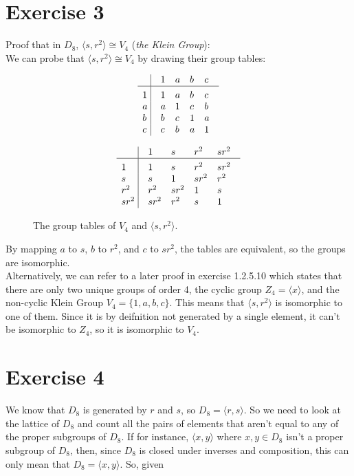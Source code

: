 \documentclass{article}
\begin{document}
    \section*{Exercise 3}
    Proof that in $D_8$, $\langle s, r^2 \rangle \cong V_4$
    (\textit{the Klein Group}): \\
    We can probe that $\langle s, r^2 \rangle \cong V_4$
    by drawing their group tables:

    \begin{figure}[H]
        \centering

        \[\vbox{\tabskip0.5em\offinterlineskip
        \halign{\strut$#$\hfil\ \tabskip1em\vrule&&$#$\hfil\cr
        ~   & 1   & a   & b & c \cr
        \noalign{\hrule}\vrule height 12pt width 0pt
        1   & 1 & a & b & c \cr 
        a   & a & 1 & c & b \cr 
        b   & b & c & 1 & a \cr 
        c   & c & b & a & 1 \cr
        }}\]

        
        \[\vbox{\tabskip0.5em\offinterlineskip
        \halign{\strut$#$\hfil\ \tabskip1em\vrule&&$#$\hfil\cr
        ~   & 1   & s   & r^2 & sr^2 \cr
        \noalign{\hrule}\vrule height 12pt width 0pt
        1   & 1 & s & r^2 & sr^2 \cr 
        s   & s & 1 & sr^2 & r^2 \cr 
        r^2   & r^2 & sr^2 & 1 & s \cr 
        sr^2   & sr^2 & r^2 & s & 1 \cr
        }}\]

        \caption{\label{fig:figure1} The group tables of $V_4$
        and $\langle s, r^2 \rangle$.}
    \end{figure}

    By mapping $a$ to $s$, $b$ to $r^2$, and $c$ to $sr^2$,
    the tables are equivalent,
    so the groups are isomorphic. \\ 
    Alternatively, we can refer to a later proof in exercise 1.2.5.10
    which states that there are only two unique groups of order 4,
    the cyclic group $Z_4 = \langle x \rangle$,
    and the non-cyclic Klein Group $V_4 = \{1, a, b, c\}$.
    This means that $\langle s, r^2 \rangle$
    is isomorphic to one of them.
    Since it is by deifnition not generated by a single element,
    it can't be isomorphic to $Z_4$,
    so it is isomorphic to $V_4$.


    \section*{Exercise 4}
    We know that $D_8$ is generated by $r$ and $s$,
    so $D_8 = \langle r, s \rangle$.
    So we need to look at the lattice of $D_8$
    and count all the pairs of elements that aren't equal to 
    any of the proper subgroups of $D_8$.
    If for instance, $\langle x, y \rangle$ where $x, y \in D_8$
    isn't a proper subgroup of $D_8$,
    then, since $D_8$ is closed under inverses and composition,
    this can only mean that $D_8 = \langle x, y \rangle$.
    So, given
\end{document}
